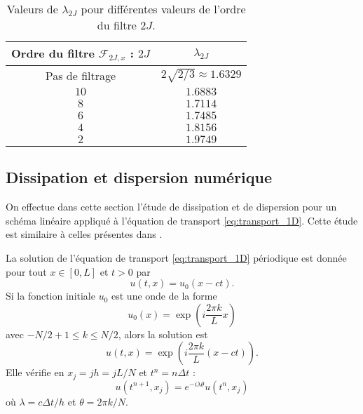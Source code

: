 \begin{table}[htbp]
\begin{center}
\begin{tabular}{|c|c|}
\hline
\textbf{Ordre du filtre} $\mathcal{F}_{2J,x}$ : $2J$ & $\lambda_{2J}$ \\
\hline
\hline
Pas de filtrage & $2 \sqrt{2/3} \approx 1.6329$ \\
$10$ & $1.6883$ \\
$ 8$ & $1.7114$ \\
$ 6$ & $1.7485$ \\
$ 4$ & $1.8156$ \\
$ 2$ & $1.9749$ \\
\hline
\end{tabular}
\end{center}
\caption{Valeurs de $\lambda_{2J}$ pour différentes valeurs de l'ordre du filtre $2J$.}
\label{tab:cfl_adv1d}
\end{table}













\subsection{Dissipation et dispersion numérique}

On effectue dans cette section l'étude de dissipation et de dispersion pour un schéma linéaire appliqué à l'équation de transport \eqref{eq:transport_1D}. Cette étude est similaire à celles présentes dans \cite{Desquesnes2007, Dubois2016}.

La solution de l'équation de transport \eqref{eq:transport_1D} périodique est donnée pour tout $x \in [0,L]$ et $t>0$ par
\begin{equation}
u(t,x)=u_0(x-ct).
\end{equation}
Si la fonction initiale $u_0$ est une onde de la forme 
\begin{equation}
u_0(x) = \exp \left( i \dfrac{2 \pi k}{L} x \right)
\end{equation}
avec $-N/2 +1 \leq k \leq N/2 $, alors la solution est
\begin{equation}
u(t,x) = \exp \left( i \dfrac{2 \pi k}{L} (x-ct) \right).
\end{equation}
Elle vérifie en $x_j = j h = j L/N$ et $t^n = n \Delta t$ :
\begin{equation}
u(t^{n+1},x_j) = e^{-i \lambda \theta} u(t^n,x_j)
\label{eq:e(ilambdateta)}
\end{equation}
où $\lambda = c \Delta t /h$ et $\theta = 2 \pi k / N$.

